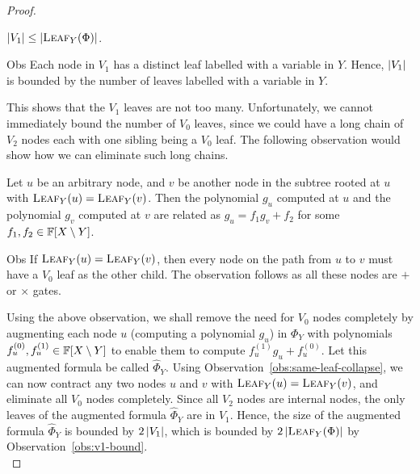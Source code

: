 \begin{proof}
  \begin{observation}\label{obs:v1-bound}$\left|V_1\right| \leq \left|\textsc{Leaf}_Y(\Phi)\right|$.    
  \end{observation}
  \begin{myproof}{Obs}
    Each node in $V_1$ has a distinct leaf labelled with a variable in
    $Y$. Hence, $\left|V_1\right|$ is bounded by the number of leaves
    labelled with a variable in $Y$.
  \end{myproof}
  
  This shows that the $V_1$ leaves are not too many. Unfortunately, we
  cannot immediately bound the number of $V_0$ leaves, since we could
  have a long chain of $V_2$ nodes each with one sibling being a $V_0$
  leaf. The following observation would show how we can eliminate such
  long chains.

  \begin{observation}\label{obs:same-leaf-collapse}
    Let $u$ be an arbitrary node, and $v$ be another node in the
    subtree rooted at $u$ with $\textsc{Leaf}_Y(u) =
    \textsc{Leaf}_Y(v)$. Then the polynomial $g_u$ computed at $u$ and
    the polynomial $g_v$ computed at $v$ are related as $g_u = f_1 g_v
    + f_2$ for some $f_1,f_2 \in \mathbb{F}[X\setminus Y]$.
  \end{observation}
  \begin{myproof}{Obs}
    If $\textsc{Leaf}_Y(u) =\textsc{Leaf}_Y(v)$, then every node on
    the path from $u$ to $v$ must have a $V_0$ leaf as the other child. The
    observation follows as all these nodes are $+$ or $\times$ gates.
  \end{myproof}

  Using the above observation, we shall remove the need for $V_0$
  nodes completely by augmenting each node $u$ (computing a polynomial
  $g_u$) in $\Phi_Y$ with polynomials $f_u^{(0)}, f_u^{(1)} \in \mathbb{F}[X\setminus Y]$
  to enable them to compute $f_u^{(1)}g_u + f_u^{(0)}$. Let this augmented formula be called $\hat{\Phi}_Y$. Using
  Observation~\ref{obs:same-leaf-collapse}, we can now contract any
  two nodes $u$ and $v$ with $\textsc{Leaf}_Y(u) =
  \textsc{Leaf}_Y(v)$, and eliminate all $V_0$ nodes
  completely. Since all $V_2$ nodes are internal nodes, the only leaves of the augmented formula $\hat{\Phi}_Y$ are in $V_1$. Hence, the size of the augmented formula $\hat{\Phi}_Y$ is  bounded by $2\left|V_1\right|$, which is bounded by
  $2\left|\textsc{Leaf}_Y(\Phi)\right|$ by Observation~\ref{obs:v1-bound}.\\


\end{proof}
